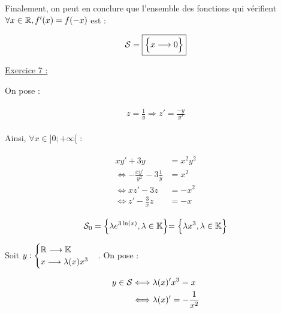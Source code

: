 \documentclass{article}
\begin{document}
Finalement, on peut en conclure que l'ensemble des fonctions qui vérifient $\forall x\in\mathbb{R}, f'(x)=f(-x)$ est :

\begin{align*}\begin{split}
\mathcal{S} = \boxed{\Bigl\{x\longrightarrow 0\Bigl\}}
\end{split}\end{align*}

\bigskip
\bigskip
\bigskip

\underline{Exercice 7 :}

\bigskip
\bigskip
\bigskip

On pose :

\begin{align*}\begin{split}
z=\frac{1}{y}\Longrightarrow z'=\frac{-y}{y^2}
\end{split}\end{align*}

Ainsi, $\forall x\in]0;+\infty[$ :

\begin{align*}\begin{split}
xy'+3y&=x^2y^2\\
\Longleftrightarrow -\frac{xy'}{y^2}-3\frac{1}{y}&=x^2\\
\Longleftrightarrow xz'-3z&=-x^2\\
\Longleftrightarrow z'-\frac{3}{x}z&=-x
\end{split}\end{align*}

\begin{align*}\begin{split}
\mathcal{S}_0=\Bigl\{\lambda e^{3\ln(x)}, \lambda\in\mathbb{K}\Bigl\}=\Bigl\{\lambda x^3, \lambda\in\mathbb{K}\Bigl\}
\end{split}\end{align*}

\bigskip
\bigskip

Soit $y:\begin{cases}\mathbb{R}\longrightarrow\mathbb{K}\\x\longrightarrow\lambda(x)x^3\end{cases}$. On pose :

\begin{align*}\begin{split}
y\in\mathcal{S} &\Longleftrightarrow \lambda(x)'x^3=x\\
&\Longleftrightarrow \lambda(x)'=-\frac{1}{x^2}\\
\end{split}\end{align*}
\end{document}
